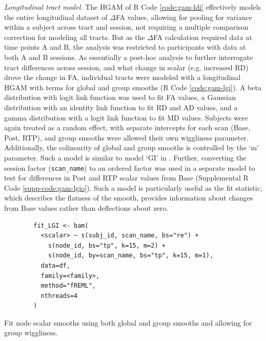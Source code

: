 \documentclass[12pt]{article}
\begin{document}
\textit{Longitudinal tract model.} The HGAM of R Code \ref{code:gam-ldi} effectively models the entire longitudinal dataset of $\Delta$FA values, allowing for pooling for variance within a subject across tract and session, not requiring a multiple comparison correction for modeling all tracts. But as the $\Delta$FA calculation required data at time points A and B, the analysis was restricted to participants with data at both A and B sessions. As essentially a post-hoc analysis to further interrogate tract differences across session, and what change in scalar (e.g. increased RD) drove the change in FA, individual tracts were modeled with a longitudinal HGAM with terms for global and group smooths (R Code \ref{code:gam-lgi}). A beta distribution with logit link function was used to fit FA values, a Gaussian distribution with an identity link function to fit RD and AD values, and a gamma distribution with a logit link function to fit MD values. Subjects were again treated as a random effect, with separate intercepts for each scan (Base, Post, RTP), and group smooths were allowed their own wiggliness parameter. Additionally, the colinearity of global and group smooths is controlled by the `m' parameter. Such a model is similar to model `GI' in \textcite{pedersen2019HierarchicalGeneralizedAdditive}. Further, converting the session factor (\lstinline{scan_name}) to an ordered factor was used in a separate model to test for differences in Post and RTP scalar values from Base (Supplemental R Code \ref{supp-code:gam-lgio}). Such a model is particularly useful as the fit statistic, which describes the flatness of the smooth, provides information about changes from Base values rather than deflections about zero.

\begin{equ}[H]
	\begin{lstlisting}
		fit_LGI <- bam(
		  <scalar> ~ s(subj_id, scan_name, bs="re") +
		    s(node_id, bs="tp", k=15, m=2) +
		    s(node_id, by=scan_name, bs="tp", k=15, m=1),
		  data=df,
		  family=<family>,
		  method="fREML",
		  nthreads=4
		)
	\end{lstlisting}
	\caption{Fit node scalar smooths using both global and group smooths and allowing for group wiggliness.}
	\label{code:gam-lgi}
\end{equ}
\end{document}
